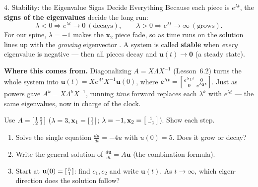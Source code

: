\documentclass[10pt]{article}
\newcommand{\uu}{\mathbf{u}}
\newcommand{\xx}{\mathbf{x}}
\newcommand{\zero}{\mathbf{0}}
\begin{document}
\begin{notesbox}{4. Stability: the Eigenvalue Signs Decide Everything}
Because each piece is $e^{\lambda t}$, the \textbf{signs of the eigenvalues} decide the long run:
\[
  \lambda<0\Rightarrow e^{\lambda t}\to 0\ (\text{decays}),\qquad
  \lambda>0\Rightarrow e^{\lambda t}\to\infty\ (\text{grows}).
\]
For our spine, $\lambda=-1$ makes the $\xx_2$ piece fade, so as time runs on the solution lines up with the
\emph{growing} eigenvector \blank{1.4cm}. A system is called \textbf{stable} when \emph{every} eigenvalue is
negative --- then all pieces decay and $\uu(t)\to\zero$ (a steady state).

\vspace{3pt}
\textbf{Where this comes from.} Diagonalizing $A=X\Lambda X^{-1}$ (Lesson~6.2) turns the whole system into
$\uu(t)=Xe^{\Lambda t}X^{-1}\uu(0)$, where $e^{\Lambda t}=\begin{bsmallmatrix}e^{\lambda_1 t}&0\\0&e^{\lambda_2 t}\end{bsmallmatrix}$.
Just as powers gave $A^k=X\Lambda^k X^{-1}$, running \emph{time} forward replaces each $\lambda^k$ with
$e^{\lambda t}$ --- the same eigenvalues, now in charge of the clock.
\end{notesbox}

\begin{practicebox}
Use $A=\begin{bsmallmatrix}1&2\\2&1\end{bsmallmatrix}$ ($\lambda=3,\xx_1=\begin{bsmallmatrix}1\\1\end{bsmallmatrix}$; $\lambda=-1,\xx_2=\begin{bsmallmatrix}1\\-1\end{bsmallmatrix}$). Show each step.
\begin{enumerate}[leftmargin=1.6em, itemsep=6pt]
  \item Solve the single equation $\frac{du}{dt}=-4u$ with $u(0)=5$. Does it grow or decay? \writeline
  \item Write the general solution of $\frac{d\uu}{dt}=A\uu$ (the combination formula). \writeline
  \item Start at $\uu(0)=\begin{bsmallmatrix}5\\1\end{bsmallmatrix}$: find $c_1,c_2$ and write $\uu(t)$. As $t\to\infty$, which eigen-direction does the solution follow? 
\end{enumerate}
\end{practicebox}
\end{document}
